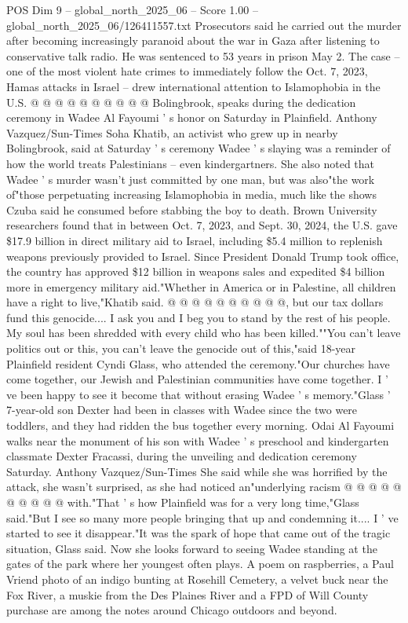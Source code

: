 \begin{textsample}{POS Dim 9 – global\_north\_2025\_06 – Score 1.00 – global\_north\_2025\_06/126411557.txt}
Prosecutors said he carried out the murder after becoming increasingly paranoid about the war in Gaza after listening to conservative talk radio.
He was sentenced to 53 years in prison May 2.
The case -- one of the most violent hate crimes to immediately follow the Oct. 7, 2023, Hamas attacks in Israel -- drew international attention to Islamophobia in the U.S. @ @ @ @ @ @ @ @ @ @ Bolingbrook, speaks during the dedication ceremony in Wadee Al Fayoumi ' s honor on Saturday in Plainfield.
Anthony Vazquez/Sun-Times Soha Khatib, an activist who grew up in nearby Bolingbrook, said at Saturday ' s ceremony Wadee ' s slaying was a reminder of how the world treats Palestinians -- even kindergartners.
She also noted that Wadee ' s murder wasn't just committed by one man, but was also"the work of"those perpetuating increasing Islamophobia in media, much like the shows Czuba said he consumed before stabbing the boy to death.
Brown University researchers found that in between Oct. 7, 2023, and Sept. 30, 2024, the U.S. gave \$17.9 billion in direct military aid to Israel, including \$5.4 million to replenish weapons previously provided to Israel.
Since President Donald Trump took office, the country has approved \$12 billion in weapons sales and expedited \$4 billion more in emergency military aid."Whether in America or in Palestine, all children have a right to live,"Khatib said. @ @ @ @ @ @ @ @ @ @, but our tax dollars fund this genocide....
I ask you and I beg you to stand by the rest of his people.
My soul has been shredded with every child who has been killed.""You can't leave politics out or this, you can't leave the genocide out of this,"said 18-year Plainfield resident Cyndi Glass, who attended the ceremony."Our churches have come together, our Jewish and Palestinian communities have come together.
I ' ve been happy to see it become that without erasing Wadee ' s memory."Glass ' 7-year-old son Dexter had been in classes with Wadee since the two were toddlers, and they had ridden the bus together every morning.
Odai Al Fayoumi walks near the monument of his son with Wadee ' s preschool and kindergarten classmate Dexter Fracassi, during the unveiling and dedication ceremony Saturday.
Anthony Vazquez/Sun-Times She said while she was horrified by the attack, she wasn't surprised, as she had noticed an"underlying racism @ @ @ @ @ @ @ @ @ @ with."That ' s how Plainfield was for a very long time,"Glass said."But I see so many more people bringing that up and condemning it....
I ' ve started to see it disappear."It was the spark of hope that came out of the tragic situation, Glass said.
Now she looks forward to seeing Wadee standing at the gates of the park where her youngest often plays.
A poem on raspberries, a Paul Vriend photo of an indigo bunting at Rosehill Cemetery, a velvet buck near the Fox River, a muskie from the Des Plaines River and a FPD of Will County purchase are among the notes around Chicago outdoors and beyond.

\end{textsample}
